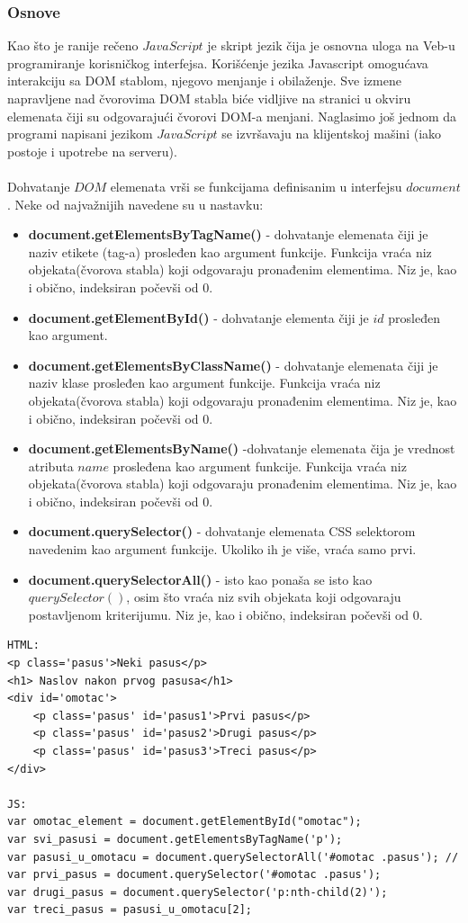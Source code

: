 \subsubsection{Osnove}
Kao što je ranije rečeno $JavaScript$ je skript jezik čija je osnovna uloga na Veb-u programiranje korisničkog interfejsa. Korišćenje jezika Javascript omogućava interakciju sa DOM stablom,
njegovo menjanje i obilaženje. Sve izmene napravljene nad čvorovima DOM stabla biće
vidljive na stranici u okviru elemenata čiji su odgovarajući čvorovi DOM-a menjani.
Naglasimo još jednom da programi napisani jezikom $JavaScript$ se izvršavaju na klijentskoj mašini (iako postoje i upotrebe na serveru).\\\\
Dohvatanje $DOM$ elemenata vrši se funkcijama definisanim u interfejsu $document$. Neke od najvažnijih navedene su u nastavku:
\begin{itemize}
\item \textbf{document.getElementsByTagName()} - dohvatanje elemenata čiji je naziv etikete (tag-a) prosleđen kao argument funkcije. Funkcija vraća niz objekata(čvorova stabla) koji odgovaraju pronađenim elementima. Niz je, kao i obično, indeksiran počevši od 0.
\item \textbf{document.getElementById()} - dohvatanje elementa čiji je $id$ prosleđen kao argument.
\item \textbf{document.getElementsByClassName()} - dohvatanje elemenata čiji je naziv klase prosleđen kao argument funkcije. Funkcija vraća niz objekata(čvorova stabla) koji odgovaraju pronađenim elementima. Niz je, kao i obično, indeksiran počevši od 0.
\item \textbf{document.getElementsByName()} -dohvatanje elemenata čija je vrednost atributa $name$  prosleđena kao argument funkcije. Funkcija vraća niz objekata(čvorova stabla) koji odgovaraju pronađenim elementima. Niz je, kao i obično, indeksiran počevši od 0.
\item \textbf{document.querySelector()} - dohvatanje elemenata CSS selektorom navedenim kao argument funkcije. Ukoliko ih je više, vraća samo prvi. 
\item \textbf{document.querySelectorAll()} - isto kao ponaša se isto kao $querySelector()$, osim što vraća niz svih objekata koji odgovaraju postavljenom kriterijumu. Niz je, kao i obično, indeksiran počevši od 0.
\end{itemize}
\begin{lstlisting}[backgroundcolor = \color{lightgray}, mathescape=true]
HTML:
<p class='pasus'>Neki pasus</p> 
<h1> Naslov nakon prvog pasusa</h1>
<div id='omotac'>
	<p class='pasus' id='pasus1'>Prvi pasus</p> 
	<p class='pasus' id='pasus2'>Drugi pasus</p>
	<p class='pasus' id='pasus3'>Treci pasus</p>
</div>

JS:
var omotac_element = document.getElementById("omotac");
var svi_pasusi = document.getElementsByTagName('p');
var pasusi_u_omotacu = document.querySelectorAll('#omotac .pasus'); // 
var prvi_pasus = document.querySelector('#omotac .pasus');
var drugi_pasus = document.querySelector('p:nth-child(2)');
var treci_pasus = pasusi_u_omotacu[2];
\end{lstlisting} 	 
